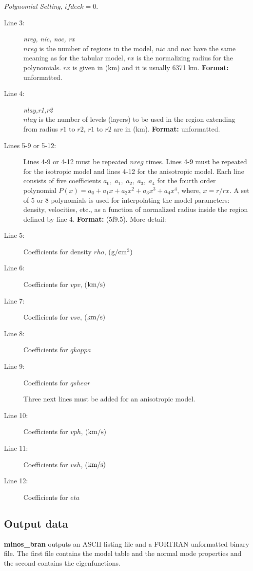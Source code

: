 \documentclass[11pt]{article}
\begin{document}
%
%
{\large\it Polynomial Setting,} {\it $ifdeck=0$}.
\begin{description}
\item[Line 3:] {\it nreg, nic, noc, rx} \\
$nreg$ is the number of regions in the model, $nic$ and $noc$ have the same meaning
as for the tabular model, $rx$ is the normalizing radius for the polynomials.
$rx$ is given in (km) and it is usually 6371 km. {\bf Format:} unformatted.
\item[Line 4:] {\it nlay,r1,r2} \\
$nlay$ is the number of levels (layers) to be used in the region extending
from radius $r1$ to $r2$, $r1$ to $r2$ are  in (km). {\bf Format:} unformatted.
%
\item[Lines 5-9 or 5-12:] Lines 4-9 or 4-12 must be repeated $nreg$ times.
Lines 4-9 must be repeated for the isotropic model and lines 4-12
for the anisotropic model. Each line consists of five
coefficients $a_0,\;a_1,\;a_2,\;a_3,\;a_4$ for the fourth order polynomial 
$P(x)=a_0+a_{1}x+a_{2}x^2+a_{3}x^3+a_{4}x^4$, where, $x=r/rx$.
A set of 5 or 8 polynomials is used for interpolating the model parameters:
density, velocities, etc.,
as a function of normalized radius inside the region defined by line 4.
{\bf Format:} (5f9.5). More detail:
\item[Line 5:] Coefficients for density $rho$, ($\rm g/cm^3)$
\item[Line 6:] Coefficients for $vpv$, ($\rm km/s)$
\item[Line 7:] Coefficients for $vsv$, ($\rm km/s)$
\item[Line 8:] Coefficients for $qkappa$
\item[Line 9:] Coefficients for $qshear$
\item[] Three next lines must be added for an anisotropic model.
\item[Line 10:] Coefficients for $vph$, ($\rm km/s)$
\item[Line 11:] Coefficients for $vsh$, ($\rm km/s)$
\item[Line 12:] Coefficients for $eta$
\end{description}

\subsection {Output data}
{\bf minos\_bran} outputs an ASCII listing file and a FORTRAN unformatted
binary file. The first file contains the model table and the normal mode properties 
and the second contains the eigenfunctions.
\end{document}
